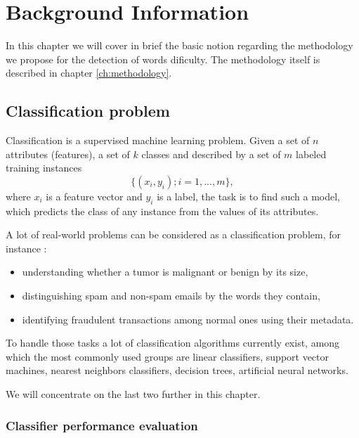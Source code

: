\chapter{Background Information}
\label{ch:background-information}

In this chapter we will cover in brief the basic notion regarding the methodology we propose for the detection of words dificulty. The methodology itself is described in chapter \ref{ch:methodology}.

\section{Classification problem}
Classification is a supervised machine learning problem. Given a set
of $n$ attributes (features), a set of $k$ classes and described by a set of $m$ labeled training instances $$\{(x_i,y_i); i=1,...,m\},$$ where $x_i$
is a feature vector and $y_i$  is a label, the task is to find such a
model, which predicts the class of any instance from the values of its attributes.

A lot of real-world problems can be considered as a classification problem, for instance \citep{Ng-2012cs229}:
\begin{itemize}
    \item understanding whether a tumor is malignant or benign by its size,
    \item distinguishing spam and non-spam emails by the words they contain,
    \item identifying fraudulent transactions among normal ones using their metadata.
\end{itemize}
To handle those tasks a lot of classification algorithms currently exist, among which the most commonly used groups are linear classifiers, support vector machines, nearest neighbors classifiers, decision trees, artificial neural networks.

We will concentrate on the last two further in this chapter.

\subsection{Classifier performance evaluation}
\label{sec:clf-eval}

